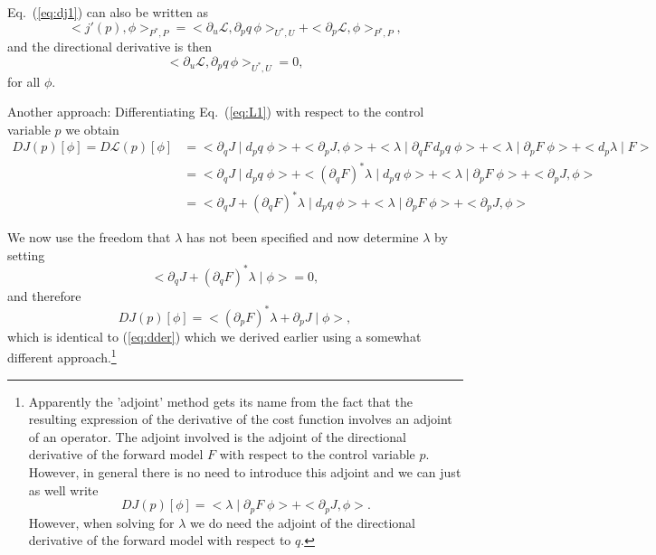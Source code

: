 \documentclass[10pt,a4paper]{book}
\newcommand{\p}{\partial}
\begin{document}
Eq.~(\ref{eq:dj1}) can also be written as
\[
< j'(p), \phi>_{P^\ast, P}= < \p_u \mathcal{L} , \p_p q \,  \phi >_{U^\ast , U}  + < \p_p \mathcal{L} , \phi>_{P^\ast,P}  ,
\]
and the directional derivative is then 
\[
<\p_u \mathcal{L}, \p_p q \, \phi>_{U^\ast, U}=0 ,
\]
for all $\phi$.

Another approach: Differentiating Eq.~(\ref{eq:L1}) with respect to the control variable $p$ we obtain
\begin{align*}
  D J(p)[\phi] = D \mathcal{L}(p)[\phi]  
   & = < \p_q J \mid d_p q \; \phi > + < \p_p  J, \phi >  + < \lambda  \mid \p_q F \, d_p q \; \phi > + < \lambda  \mid \p_p F \; \phi > + < d_p \lambda \mid F > \\
  & = < \p_q J \mid d_p q \; \phi >   + < (\p_q F)^\ast\lambda  \mid  d_p q \; \phi > + < \lambda  \mid \p_p F \; \phi > + < \p_p  J, \phi > \\
  & = < \p_q J +( \p_q F)^\ast\lambda \mid d_p q \; \phi >   + < \lambda  \mid \p_p F \; \phi > + < \p_p  J, \phi >
\end{align*}


We now use the freedom that $\lambda$ has not been specified and now determine $\lambda$ by setting
\[
  < \p_q J +( \p_q F)^\ast\lambda \mid \phi >  =0 ,
  \]
and therefore 
\begin{equation}
  D J(p)[\phi] = < (\p_p F)^\ast \lambda  + \p_p J \mid  \phi >,
  \label{eq:idder}
\end{equation}
which is identical to (\ref{eq:dder}) which we derived earlier using a
somewhat different approach.\footnote{Apparently the 'adjoint' method
  gets its name from the fact that the resulting expression of the
  derivative of the cost function involves an adjoint of an
  operator. The adjoint involved is the adjoint of the directional
  derivative of the forward model $F$ with respect to the control
  variable $p$. However, in general there is no need to introduce
  this adjoint and we can just as well write
\[
  D J(p)[\phi] = < \lambda \mid \p_p F \; \phi > + < \p_p J, \phi >
  .\] However, when solving for $\lambda$ we do need the adjoint of
  the directional derivative of the forward model with respect to $q$.}
\end{document}
